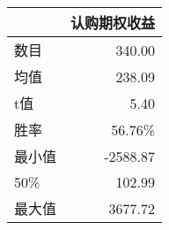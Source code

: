 \begin{tabular}{lr}
\toprule
{} &   认购期权收益 \\
\midrule
数目 &   340.00 \\
均值  &   238.09 \\
t值   &   5.40 \\
胜率 & 56.76\%  \\
最小值  & -2588.87 \\
50\%   &   102.99 \\
最大值   &  3677.72 \\
\bottomrule 
\end{tabular}
